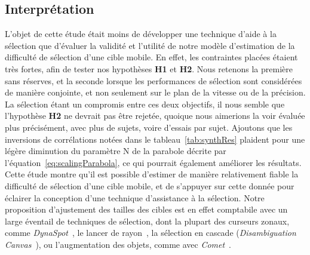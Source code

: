 	\subsection{Interprétation}
	L'objet de cette étude était moins de développer une technique d'aide à la sélection que d'évaluer la validité et l'utilité de notre modèle d'estimation de la difficulté de sélection d'une cible mobile. En effet, les contraintes placées étaient très fortes, afin de tester nos hypothèses \textbf{H1} et \textbf{H2}. Nous retenons la première sans réserves, et la seconde lorsque les performances de sélection sont considérées de manière conjointe, et non seulement sur le plan de la vitesse ou de la précision. La sélection étant un compromis entre ces deux objectifs, il nous semble que l'hypothèse \textbf{H2} ne devrait pas être rejetée, quoique nous aimerions la voir évaluée plus précisément, avec plus de sujets, voire d'essais par sujet. Ajoutons que les inversions de corrélations notées dans le tableau~\ref{tab:synthRes} plaident pour une légère diminution du paramètre N de la parabole décrite par l'équation~\ref{eq:scalingParabola}, ce qui pourrait également améliorer les résultats. Cette étude montre qu'il est possible d'estimer de manière relativement fiable la difficulté de sélection d'une cible mobile, et de s'appuyer sur cette donnée pour éclairer la conception d'une technique d'assistance à la sélection. Notre proposition d'ajustement des tailles des cibles est en effet comptabile avec un large éventail de techniques de sélection, dont la plupart des curseurs zonaux, comme \emph{DynaSpot}~\cite{chapuis2009dynaspot}, le lancer de rayon~\cite{grossman2006design}, la sélection en cascade (\emph{Disambiguation Canvas}~\cite{debarba2013disambiguation}), ou l'augmentation des objets, comme avec \emph{Comet}~\cite{hasan2011comet}.
	
